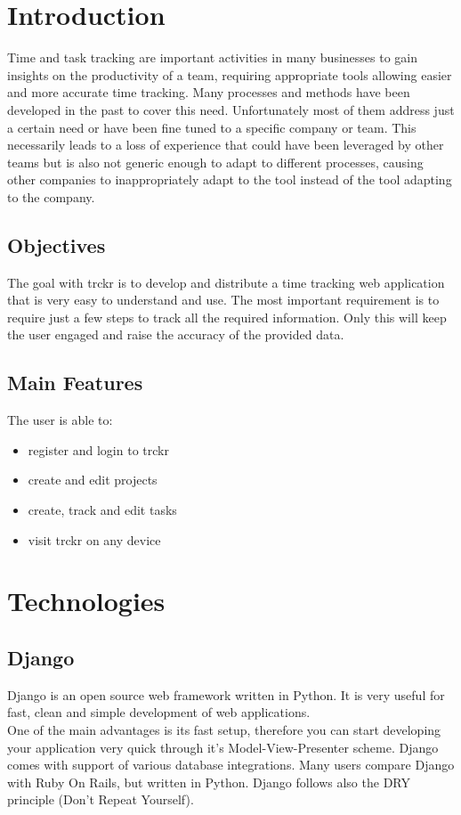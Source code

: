 \documentclass[a4paper, 12pt, headsepline]{scrartcl}
\begin{document}
\section{Introduction}
Time and task tracking are important activities in many businesses to gain
insights on the productivity of a team, requiring appropriate tools allowing
easier and more accurate time tracking. Many processes and methods have been
developed in the past to cover this need. Unfortunately most of them address
just a certain need or have been fine tuned to a specific company or team. This
necessarily leads to a loss of experience that could have been leveraged by
other teams but is also not generic enough to adapt to different processes,
causing other companies to inappropriately adapt to the tool instead of the tool
adapting to the company.

\subsection{Objectives}
The goal with trckr is to develop and distribute a time tracking web application
that is very easy to understand and use. The most important requirement is to
require just a few steps to track all the required information. Only this will
keep the user engaged and raise the accuracy of the provided data.

\subsection{Main Features}
The user is able to:
\begin{itemize}
    \item register and login to trckr
    \item create and edit projects
    \item create, track and edit tasks
    \item visit trckr on any device
\end{itemize}

\section{Technologies}
\subsection{Django}
Django is an open source web framework written in Python. It is very useful for fast, clean and simple development of web applications.\\
One of the main advantages is its fast setup, therefore you can start developing your application very quick through it's Model-View-Presenter scheme.
Django comes with support of various database integrations. Many users compare Django with Ruby On Rails, but written in Python.
Django follows also the DRY principle (Don't Repeat Yourself).
\end{document}
